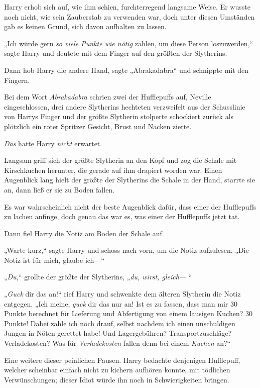 {Harry erhob sich auf, wie ihm schien, furchterregend langsame Weise. Er wusste noch nicht, wie sein Zauberstab zu verwenden war, doch unter diesen Umständen gab es keinen Grund, sich davon aufhalten zu lassen.

„Ich würde gern \emph{so viele Punkte wie nötig} zahlen, um diese Person loszuwerden,“ sagte Harry und deutete mit dem Finger auf den größten der Slytherins.

Dann hob Harry die andere Hand, sagte „Abrakadabra“ und schnippte mit den Fingern.

Bei dem Wort \emph{Abrakadabra} schrien zwei der Hufflepuffs auf, Neville eingeschlossen, drei andere Slytherins hechteten verzweifelt aus der Schusslinie von Harrys Finger und der größte Slytherin stolperte schockiert zurück als plötzlich ein roter Spritzer Gesicht, Brust und Nacken zierte.

\emph{Das} hatte Harry \emph{nicht} erwartet.

Langsam griff sich der größte Slytherin an den Kopf und zog die Schale mit Kirschkuchen herunter, die gerade auf ihm drapiert worden war. Einen Augenblick lang hielt der größte der Slytherins die Schale in der Hand, starrte sie an, dann ließ er sie zu Boden fallen.

Es war wahrscheinlich nicht der beste Augenblick dafür, dass einer der Hufflepuffs zu lachen anfinge, doch genau das war es, was einer der Hufflepuffs jetzt tat.

Dann fiel Harry die Notiz am Boden der Schale auf.

„Warte kurz,“ sagte Harry und schoss nach vorn, um die Notiz aufzulesen. „Die Notiz ist für mich, glaube ich—“

„\emph{Du,}“ grollte der größte der Slytherins, „\emph{du, wirst, gleich—} “

„\emph{Guck} dir das an!“ rief Harry und schwenkte dem älteren Slytherin die Notiz entgegen. „Ich meine, \emph{guck} dir das nur an! Ist es zu fassen, dass man mir 30 Punkte berechnet für Lieferung und Abfertigung von einem lausigen Kuchen? 30 Punkte! Dabei zahle ich noch drauf, selbst nachdem ich einen unschuldigen Jungen in Nöten gerettet habe! Und Lagergebühren? Transportzuschläge? Verladekosten? Was für \emph{Verladekosten} fallen denn bei einem \emph{Kuchen} an?“

Eine weitere dieser peinlichen Pausen. Harry bedachte denjenigen Hufflepuff, welcher scheinbar einfach nicht zu kichern aufhören konnte, mit tödlichen Verwünschungen; dieser Idiot würde ihn noch in Schwierigkeiten bringen.

}
